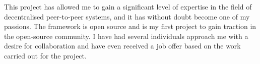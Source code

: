 This project has allowed me to gain a significant level of expertise in the field of decentralised peer-to-peer systems, and it has without doubt become one of my passions. The framework is open source and is my first project to gain traction in the open-source community. I have had several individuals approach me with a desire for collaboration and have even received a job offer based on the work carried out for the project.


